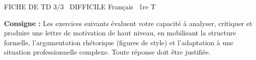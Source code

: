 \documentclass[11pt]{article}
\begin{document}
\thispagestyle{empty}

\begin{tcolorbox}[enhanced,colback=popink,colframe=popink,arc=10pt,boxrule=0pt,left=12pt,right=12pt,top=9pt,bottom=9pt]
{\color{white}\popxbold\small FICHE DE TD 3/3 \textbullet\ DIFFICILE \hfill Français \textbullet\ 1re T\par}
\end{tcolorbox}
\vspace{4pt}

\noindent\textbf{Consigne :} Les exercices suivants évaluent votre capacité à analyser, critiquer et produire une lettre de motivation de haut niveau, en mobilisant la structure formelle, l'argumentation rhétorique (figures de style) et l'adaptation à une situation professionnelle complexe. Toute réponse doit être justifiée.
\end{document}

